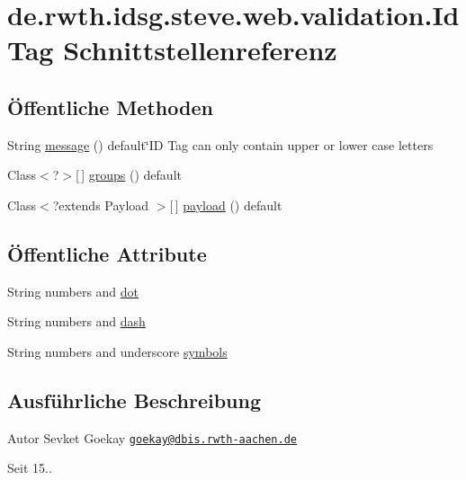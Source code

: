 \hypertarget{interfacede_1_1rwth_1_1idsg_1_1steve_1_1web_1_1validation_1_1_id_tag}{\section{de.\-rwth.\-idsg.\-steve.\-web.\-validation.\-Id\-Tag Schnittstellenreferenz}
\label{interfacede_1_1rwth_1_1idsg_1_1steve_1_1web_1_1validation_1_1_id_tag}
}
\subsection*{Öffentliche Methoden}
\begin{DoxyCompactItemize}
\item 
String \hyperlink{interfacede_1_1rwth_1_1idsg_1_1steve_1_1web_1_1validation_1_1_id_tag_aea2d0e0b5fd8d1d383d8774df050919a}{message} () default\char`\"{}I\-D Tag can only contain upper or lower case letters
\item 
Class$<$?$>$\mbox{[}$\,$\mbox{]} \hyperlink{interfacede_1_1rwth_1_1idsg_1_1steve_1_1web_1_1validation_1_1_id_tag_acddbe2b26350553ce8d363581e686557}{groups} () default
\item 
Class$<$?extends Payload $>$\mbox{[}$\,$\mbox{]} \hyperlink{interfacede_1_1rwth_1_1idsg_1_1steve_1_1web_1_1validation_1_1_id_tag_a56fe755f86ae87347fd5078dd5d18c64}{payload} () default
\end{DoxyCompactItemize}
\subsection*{Öffentliche Attribute}
\begin{DoxyCompactItemize}
\item 
String numbers and \hyperlink{interfacede_1_1rwth_1_1idsg_1_1steve_1_1web_1_1validation_1_1_id_tag_a39834f0933c670923b9547c9606aa61b}{dot}
\item 
String numbers and \hyperlink{interfacede_1_1rwth_1_1idsg_1_1steve_1_1web_1_1validation_1_1_id_tag_aa0d09b323e37c7ef9c04d2ed5f337e8d}{dash}
\item 
String numbers and underscore \hyperlink{interfacede_1_1rwth_1_1idsg_1_1steve_1_1web_1_1validation_1_1_id_tag_a19a9f8538560b959db4b406c1576862e}{symbols}
\end{DoxyCompactItemize}


\subsection{Ausführliche Beschreibung}
\begin{DoxyAuthor}{Autor}
Sevket Goekay \href{mailto:goekay@dbis.rwth-aachen.de}{\tt goekay@dbis.\-rwth-\/aachen.\-de} 
\end{DoxyAuthor}
\begin{DoxySince}{Seit}
15.. 
\end{DoxySince}


